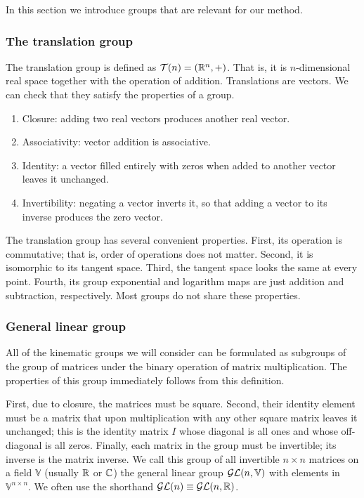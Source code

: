 \documentclass[../../main.tex]{subfiles}
\begin{document}
\begin{refsection}
	In this section we introduce groups that are relevant for our method.

	\subsubsection{The translation group}\label{the-translation-group}

	The translation group is defined as $\mathcal{T} (n) = (\mathbb{R}^n, +)$.
	That is, it is $n$-dimensional real space together with the operation of addition.
	Translations are vectors.
	We can check that they satisfy the properties of a group.
	\begin{enumerate}
		\def\labelenumi{\arabic{enumi}.}
		\item
		      Closure: adding two real vectors produces another real vector.
		\item
		      Associativity: vector addition is associative.
		\item
		      Identity: a vector filled entirely with zeros when added to another vector leaves it unchanged.
		\item
		      Invertibility: negating a vector inverts it, so that adding a vector to its inverse produces the zero vector.
	\end{enumerate}
	The translation group has several convenient properties.
	First, its operation is commutative; that is, order of operations does not matter.
	Second, it is isomorphic to its tangent space.
	Third, the tangent space looks the same at every point.
	Fourth, its group exponential and logarithm maps are just addition and subtraction, respectively.
	Most groups do not share these properties.

	\subsubsection{General linear group}\label{general-linear-group}

	All of the kinematic groups we will consider can be formulated as subgroups of the group of matrices under the binary operation of matrix multiplication.
	The properties of this group immediately follows from this definition.

	First, due to closure, the matrices must be square.
	Second, their identity element must be a matrix that upon multiplication with any other square matrix leaves it unchanged; this is the identity matrix $I$ whose diagonal is all ones and whose off-diagonal is all zeros.
	Finally, each matrix in the group must be invertible; its inverse is the matrix inverse.
	We call this group of all invertible $n \times n$ matrices on a field $\mathbb{V}$ (usually $\mathbb{R}$ or $\mathbb{C}$) the general linear group $\mathcal{GL} (n, \mathbb{V})$ with elements in $\mathbb{V}^{n \times n}$.
	We often use the shorthand $\mathcal{GL} (n) \equiv \mathcal{GL} (n, \mathbb{R})$.


\end{refsection}
\end{document}
